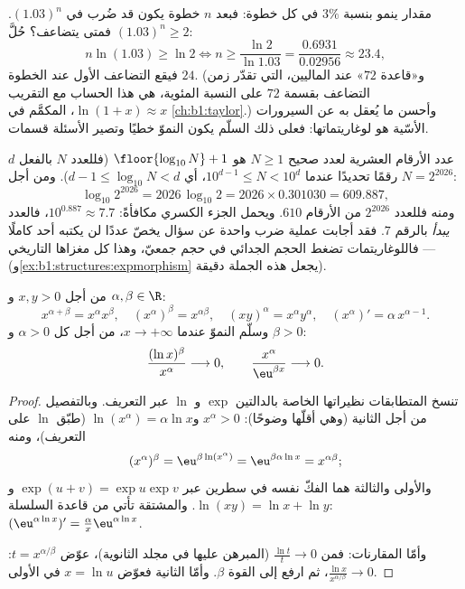 \begin{example}\label{ex:b1:functions:doubling}
مقدار ينمو بنسبة $3\%$ في كل خطوة: فبعد $n$ خطوة يكون قد ضُرب
في $(1.03)^n$. فمتى يتضاعف؟ حُلَّ $(1.03)^n
\geq 2$:
\[
n\ln(1.03) \geq \ln2
\iff n \geq \frac{\ln 2}{\ln 1.03}
= \frac{0.6931}{0.02956} \approx 23.4 ,
\]
فيقع التضاعف الأول عند الخطوة $24$. (و«قاعدة $72$» عند
الماليين، التي تقدّر زمن التضاعف بقسمة
$72$ على النسبة المئوية، هي هذا الحساب مع
التقريب $\ln(1 + x) \approx x$، المكمَّم في
\cref{ch:b1:taylor}.) وأحسن ما يُعقل به عن
السيرورات الأسّية هو لوغاريتماتها: فعلى ذلك السلّم يكون
النموّ خطيًا وتصير الأسئلة قسمات.

\end{example}

\begin{example}\label{ex:b1:functions:digits}
عدد الأرقام العشرية لعدد صحيح $N \geq 1$ هو
$\floor{\log_{10} N} + 1$ (فللعدد $N$ بالفعل $d$ رقمًا تحديدًا عندما
$10^{d-1} \leq N < 10^d$، أي $d - 1 \leq \log_{10}N < d$). ومن أجل
$N = 2^{2026}$:
\[
\log_{10} 2^{2026} = 2026\,\log_{10}2
= 2026 \times 0.301030 = 609.887 ,
\]
ومنه فللعدد $2^{2026}$ من الأرقام $610$. ويحمل الجزء الكسري
مكافأةً: $10^{0.887} \approx 7.7$، فالعدد \emph{يبدأ} بالرقم
$7$. فقد أجابت عملية ضرب واحدة عن سؤال يخصّ عددًا لن يكتبه
أحد كاملًا --- فاللوغاريتمات تضغط الحجم الجدائي
في حجم جمعيّ، وهذا كل مغزاها التاريخي
(و\cref{ex:b1:structures:expmorphism} يجعل هذه الجملة دقيقة).
\end{example}

\begin{proposition}\label{prop:b1:functions:powerrules}
من أجل $x, y > 0$ و $\alpha, \beta \in \R$:
\[
x^{\alpha+\beta} = x^\alpha x^\beta, \quad
(x^\alpha)^\beta = x^{\alpha\beta}, \quad
(xy)^\alpha = x^\alpha y^\alpha, \quad
(x^\alpha)' = \alpha\, x^{\alpha - 1}.
\]
وسلّم النموّ عندما $x \to +\infty$، من أجل كل
$\alpha > 0$ و $\beta > 0$:
\[
\frac{(\ln x)^\beta}{x^\alpha} \longrightarrow 0,
\qquad
\frac{x^\alpha}{\eu^{\beta x}} \longrightarrow 0 .
\]
\end{proposition}

\begin{proof}
تنسخ المتطابقات نظيراتها الخاصة بالدالتين $\exp$ و $\ln$ عبر
التعريف. وبالتفصيل من أجل الثانية (وهي أقلّها وضوحًا): $x^\alpha
> 0$ و$\ln(x^\alpha) = \alpha\ln x$ (طبّق $\ln$ على
التعريف)، ومنه
\[
(x^\alpha)^\beta = \eu^{\beta\ln(x^\alpha)}
= \eu^{\beta\alpha\ln x} = x^{\alpha\beta} ;
\]
والأولى والثالثة هما الفكّ نفسه في سطرين عبر
$\exp(u + v) = \exp u\exp v$ و$\ln(xy) = \ln x + \ln y$. والمشتقة
تأتي من قاعدة السلسلة: $(\eu^{\alpha\ln x})' =
\frac{\alpha}{x} \eu^{\alpha\ln x}$.

وأمّا المقارنات: فمن $\frac{\ln t}{t} \to 0$ (المبرهن عليها في
مجلد الثانوية)، عوّض $t = x^{\alpha/\beta}$:
$\frac{\ln x}{x^{\alpha/\beta}} \to 0$، ثم ارفع إلى القوة
$\beta$. وأمّا الثانية فعوّض $x = \ln u$ في الأولى.
\end{proof}


